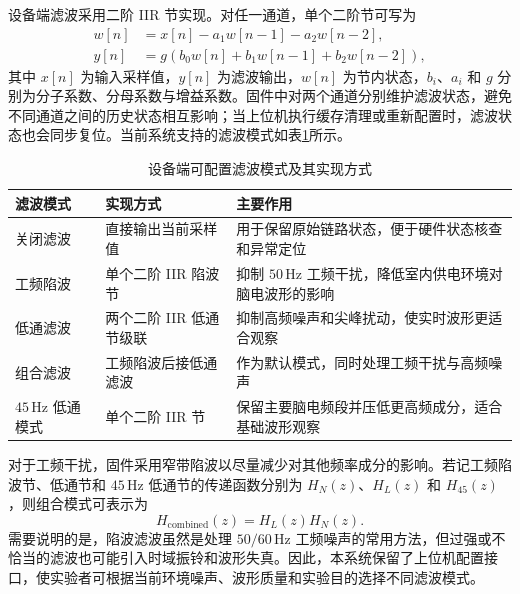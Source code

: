 设备端滤波采用二阶 IIR 节实现。对任一通道，单个二阶节可写为
\begin{equation}
\begin{aligned}
w[n] &= x[n]-a_1w[n-1]-a_2w[n-2],\\
y[n] &= g\left(b_0w[n]+b_1w[n-1]+b_2w[n-2]\right),
\end{aligned}
\label{eq:c3_iir_biquad}
\end{equation}
其中 $x[n]$ 为输入采样值，$y[n]$ 为滤波输出，$w[n]$ 为节内状态，$b_i$、$a_i$ 和 $g$ 分别为分子系数、分母系数与增益系数。固件中对两个通道分别维护滤波状态，避免不同通道之间的历史状态相互影响；当上位机执行缓存清理或重新配置时，滤波状态也会同步复位。当前系统支持的滤波模式如表\ref{tab:c3_filter_modes}所示。

\begin{table}[htbp]
    \centering
    \caption{设备端可配置滤波模式及其实现方式}
    \label{tab:c3_filter_modes}
    \small
    \begin{tabular}{p{2.5cm}p{3.2cm}p{7.0cm}}
        \hline
        滤波模式 & 实现方式 & 主要作用 \\
        \hline
        关闭滤波 & 直接输出当前采样值 & 用于保留原始链路状态，便于硬件状态核查和异常定位 \\
        工频陷波 & 单个二阶 IIR 陷波节 & 抑制 $50\,\mathrm{Hz}$ 工频干扰，降低室内供电环境对脑电波形的影响 \\
        低通滤波 & 两个二阶 IIR 低通节级联 & 抑制高频噪声和尖峰扰动，使实时波形更适合观察 \\
        组合滤波 & 工频陷波后接低通滤波 & 作为默认模式，同时处理工频干扰与高频噪声 \\
        $45\,\mathrm{Hz}$ 低通模式 & 单个二阶 IIR 节 & 保留主要脑电频段并压低更高频成分，适合基础波形观察 \\
        \hline
    \end{tabular}
\end{table}

对于工频干扰，固件采用窄带陷波以尽量减少对其他频率成分的影响。若记工频陷波节、低通节和 $45\,\mathrm{Hz}$ 低通节的传递函数分别为 $H_N(z)$、$H_L(z)$ 和 $H_{45}(z)$，则组合模式可表示为
\begin{equation}
H_{\mathrm{combined}}(z)=H_L(z)H_N(z).
\label{eq:c3_combined_filter}
\end{equation}
需要说明的是，陷波滤波虽然是处理 $50/60\,\mathrm{Hz}$ 工频噪声的常用方法，但过强或不恰当的滤波也可能引入时域振铃和波形失真\cite{leske2019line_noise}。因此，本系统保留了上位机配置接口，使实验者可根据当前环境噪声、波形质量和实验目的选择不同滤波模式。

